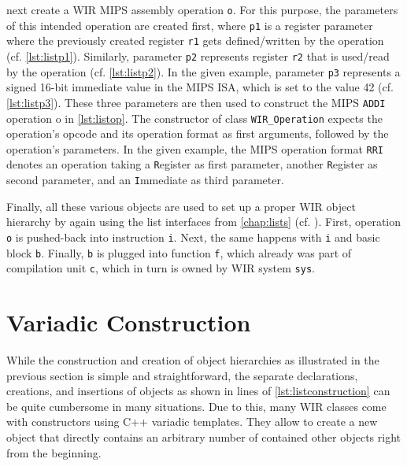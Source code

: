  next create a \gls{WIR} MIPS assembly operation \texttt{o}.
For this purpose, the parameters of this intended operation are created first, where \texttt{p1} is a register parameter where the previously created register \texttt{r1} gets defined/written by the operation (cf. \cref{lst:listp1}).
Similarly, parameter \texttt{p2} represents register \texttt{r2} that is used/read by the operation (cf. \cref{lst:listp2}).
In the given example, parameter \texttt{p3} represents a signed 16-bit immediate value in the MIPS \gls{ISA}, which is set to the value 42 (cf. \cref{lst:listp3}).
These three parameters are then used to construct the MIPS \texttt{ADDI} operation {o} in \cref{lst:listop}.
The constructor of class \texttt{WIR\_Operation} expects the operation's opcode and its operation format as first arguments, followed by the operation's parameters.
In the given example, the MIPS operation format \texttt{RRI} denotes an operation taking a \texttt{R}egister as first parameter, another \texttt{R}egister as second parameter, and an \texttt{I}mmediate as third parameter.

Finally, all these various objects are used to set up a proper \gls{WIR} object hierarchy by again using the list interfaces from \cref{chap:lists} (cf. ).
First, operation \texttt{o} is pushed-back into instruction \texttt{i}.
Next, the same happens with \texttt{i} and basic block \texttt{b}.
Finally, \texttt{b} is plugged into function \texttt{f}, which already was part of compilation unit \texttt{c}, which in turn is owned by \gls{WIR} system \texttt{sys}.


\section{Variadic Construction}
\label{sec:variadicconstruction}

While the construction and creation of object hierarchies as illustrated in the previous section is simple and straightforward, the separate declarations, creations, and insertions of objects as shown in lines  of \cref{lst:listconstruction} can be quite cumbersome in many situations.
Due to this, many \gls{WIR} classes come with constructors using C++ variadic templates.
They allow to create a new object that directly contains an arbitrary number of contained other objects right from the beginning.

